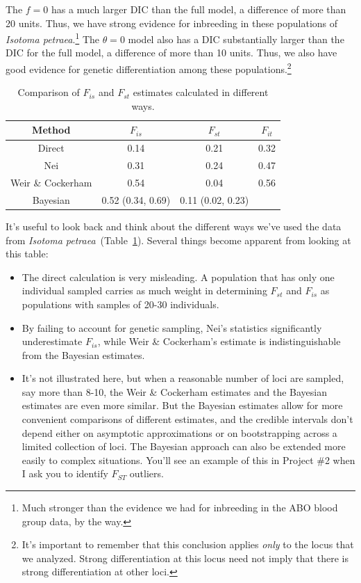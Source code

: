 \documentclass[12pt]{article}
\begin{document}
The $f=0$ has a much larger DIC than the full model, a difference of
more than 20 units. Thus, we have strong evidence for inbreeding in
these populations of {\it Isotoma petraea}.\footnote{Much stronger
  than the evidence we had for inbreeding in the ABO blood group data,
  by the way.} The $\theta = 0$ model also has a DIC substantially
larger than the DIC for the full model, a difference of more than 10
units. Thus, we also have good evidence for genetic differentiation
among these populations.\footnote{It's important to remember that this
  conclusion applies {\it only\/} to the locus that we
  analyzed. Strong differentiation at this locus need not imply that
  there is strong differentiation at other loci.}

\begin{table}
\begin{center}
\begin{tabular}{c|ccc}
\hline\hline
Method & $F_{is}$ & $F_{st}$ & $F_{it}$ \\
\hline
Direct            & 0.14 & 0.21 & 0.32 \\
Nei               & 0.31 & 0.24 & 0.47 \\
Weir \& Cockerham & 0.54 & 0.04 & 0.56 \\
Bayesian          & 0.52 (0.34, 0.69) & 0.11 (0.02, 0.23) \\
\hline
\end{tabular}
\end{center}
\caption{Comparison of $F_{is}$ and $F_{st}$ estimates calculated in
  different ways.}\label{table:compare}
\end{table}

It's useful to look back and think about the different ways we've used
the data from {\it Isotoma
  petraea}~(Table~\ref{table:compare}). Several things become apparent
from looking at this table:

\begin{itemize}

\item The direct calculation is very misleading. A population that
  has only one individual sampled carries as much weight in
  determining $F_{st}$ and $F_{is}$ as populations with samples of
  20-30 individuals.

\item By failing to account for genetic sampling, Nei's statistics
  significantly underestimate $F_{is}$, while Weir \& Cockerham's
  estimate is indistinguishable from the Bayesian estimates.

\item It's not illustrated here, but when a reasonable number of loci
  are sampled, say more than 8-10, the Weir \& Cockerham estimates and
  the Bayesian estimates are even more similar. But the Bayesian estimates
  allow for more convenient comparisons of different estimates, and
  the credible intervals don't depend either on asymptotic
  approximations or on bootstrapping across a limited collection of
  loci. The Bayesian approach can also be extended more easily to
  complex situations. You'll see an example of this in Project \#2
  when I ask you to identify $F_{ST}$ outliers.

\end{itemize}




\ccLicense
\end{document}
